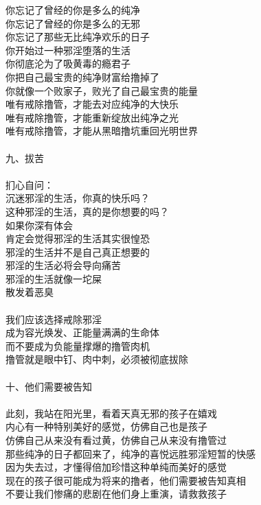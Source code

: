 \begin{poem}
\begin{adjustwidth}{-4em}{-4em}
\begin{multicols}{2}
            你忘记了曾经的你是多么的纯净 \\ 你忘记了曾经的你是多么的无邪 \\ 你忘记了那些无比纯净欢乐的日子 \\ 你开始过一种邪淫堕落的生活 \\ 你彻底沦为了吸黄毒的瘾君子 \\ 你把自己最宝贵的纯净财富给撸掉了 \\ 你就像一个败家子，败光了自己最宝贵的能量 \\ 唯有戒除撸管，才能去对应纯净的大快乐 \\ 唯有戒除撸管，才能重新绽放出纯净之光 \\ 唯有戒除撸管，才能从黑暗撸坑重回光明世界 \\~\\
            九、拔苦 \\~\\
            扪心自问： \\ 沉迷邪淫的生活，你真的快乐吗？ \\ 这种邪淫的生活，真的是你想要的吗？ \\ 如果你深有体会 \\ 肯定会觉得邪淫的生活其实很惶恐 \\ 邪淫的生活并不是自己真正想要的 \\ 邪淫的生活必将会导向痛苦 \\ 邪淫的生活就像一坨屎 \\ 散发着恶臭 \\~\\
            我们应该选择戒除邪淫 \\ 成为容光焕发、正能量满满的生命体 \\ 而不要成为负能量撑爆的撸管肉机 \\ 撸管就是眼中钉、肉中刺，必须被彻底拔除 \\~\\
            十、他们需要被告知 \\~\\
            此刻，我站在阳光里，看着天真无邪的孩子在嬉戏 \\ 内心有一种特别美好的感觉，仿佛自己也是孩子 \\ 仿佛自己从来没有看过黄，仿佛自己从来没有撸管过 \\ 那些纯净的日子都回来了，纯净的喜悦远胜邪淫短暂的快感 \\ 因为失去过，才懂得倍加珍惜这种单纯而美好的感觉 \\ 现在的孩子很可能成为将来的撸者，他们需要被告知真相 \\ 不要让我们惨痛的悲剧在他们身上重演，请救救孩子
        \end{multicols}
    \end{adjustwidth}
\end{poem}

